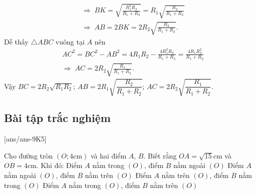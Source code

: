 \begin{bt}
{\begin{align*}
	&\Rightarrow\; BK=\sqrt{\frac{R_1^2R_2}{R_1+R_2}}=R_1\sqrt{\frac{R_2}{R_1+R_2}}\\
	&\Rightarrow\; AB=2BK=2R_2\sqrt{\frac{R_2}{R_1+R_2}}.
	\end{align*}
	Dễ thấy $\triangle ABC$ vuông tại $A$ nên
	\begin{align*}
	&AC^2=BC^2-AB^2=4R_1R_2-\frac{4R_1^2R_2}{R_1+R_2}=\frac{4R_1R_2^2}{R_1+R_2}\\
	&\Rightarrow\; AC=2R_2\sqrt{\frac{R_1}{R_1+R_2}}.
	\end{align*}
	Vậy $BC=2R_2\sqrt{R_1R_2}$; $AB=2R_1\sqrt{\dfrac{R_2}{R_1+R_2}}$; $AC=2R_2\sqrt{\dfrac{R_1}{R_1+R_2}}.$
	}
\end{bt}
\subsection{Bài tập trắc nghiệm}
[ans/ans-9K5]
\begin{ex}
	Cho đường tròn $(O; 4 \mathrm{cm})$ và hai điểm $A$, $B$. Biết rằng $OA=\sqrt{15} \mathrm{cm}$ và $OB=4 \mathrm{cm}$. Khi đó:
	\choice
	{Điểm $A$ nằm trong $(O)$, điểm $B$ nằm ngoài $(O)$}
	{Điểm $A$ nằm ngoài $(O)$, điểm $B$ nằm trên $(O)$}
	{\True Điểm $A$ nằm trên $(O)$, điểm $B$ nằm trong $(O)$}
	{Điểm $A$ nằm trong $(O)$, điểm $B$ nằm trên $(O)$}
\end{ex}
